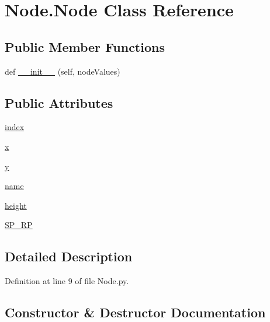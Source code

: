 \hypertarget{class_node_1_1_node}{}\section{Node.\+Node Class Reference}
\label{class_node_1_1_node}
\subsection*{Public Member Functions}
\begin{DoxyCompactItemize}
\item 
def \hyperlink{class_node_1_1_node_a07eea18e16b4ea130ed202d99512091b}{\+\_\+\+\_\+init\+\_\+\+\_\+} (self, node\+Values)
\end{DoxyCompactItemize}
\subsection*{Public Attributes}
\begin{DoxyCompactItemize}
\item 
\hyperlink{class_node_1_1_node_aef9465565b12f9f28b6aefe822948af5}{index}
\item 
\hyperlink{class_node_1_1_node_a6bfcdef2c07be856e8850fcbdbb82025}{x}
\item 
\hyperlink{class_node_1_1_node_aab9b32354c529afe23970aeda52308b9}{y}
\item 
\hyperlink{class_node_1_1_node_a66728b66d1a530a57277759e3993550c}{name}
\item 
\hyperlink{class_node_1_1_node_aca249f2f0b0bcb239c4e201048412b72}{height}
\item 
\hyperlink{class_node_1_1_node_a036a86db86d1899d2dff6915f6092328}{S\+P\+\_\+\+RP}
\end{DoxyCompactItemize}


\subsection{Detailed Description}


Definition at line 9 of file Node.\+py.



\subsection{Constructor \& Destructor Documentation}
\mbox{\label{class_node_1_1_node_a07eea18e16b4ea130ed202d99512091b}} 

